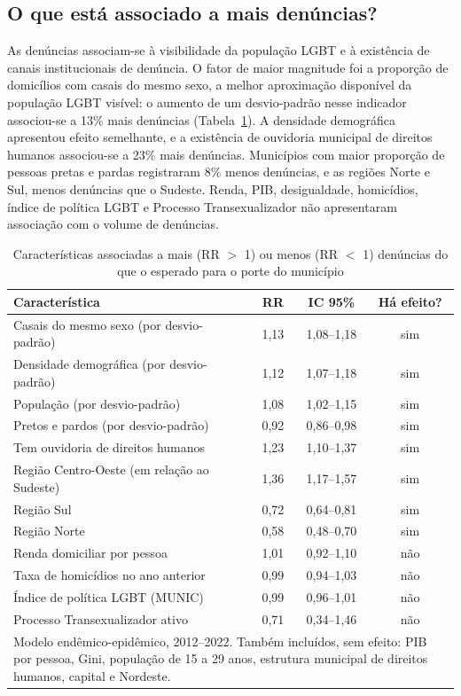 \documentclass[12pt]{article}
\begin{document}
\subsection{O que está associado a mais denúncias?}

As denúncias associam-se à visibilidade da população LGBT e à existência de canais institucionais de denúncia. O fator de maior magnitude foi a proporção de domicílios com casais do mesmo sexo, a melhor aproximação disponível da população LGBT visível: o aumento de um desvio-padrão nesse indicador associou-se a 13\% mais denúncias (Tabela~\ref{tab:coef}). A densidade demográfica apresentou efeito semelhante, e a existência de ouvidoria municipal de direitos humanos associou-se a 23\% mais denúncias. Municípios com maior proporção de pessoas pretas e pardas registraram 8\% menos denúncias, e as regiões Norte e Sul, menos denúncias que o Sudeste. Renda, PIB, desigualdade, homicídios, índice de política LGBT e Processo Transexualizador não apresentaram associação com o volume de denúncias.

\begin{table}[!htb]
\centering
\caption{Características associadas a mais (RR $>$ 1) ou menos (RR $<$ 1) denúncias do que o esperado para o porte do município}
\label{tab:coef}
{\renewcommand{\arraystretch}{1.1}\small
\begin{tabular}{p{6.8cm} c c c}
\toprule
\textbf{Característica} & \textbf{RR} & \textbf{IC 95\%} & \textbf{Há efeito?} \\
\midrule
Casais do mesmo sexo (por desvio-padrão) & 1,13 & 1,08--1,18 & sim \\
Densidade demográfica (por desvio-padrão) & 1,12 & 1,07--1,18 & sim \\
População (por desvio-padrão) & 1,08 & 1,02--1,15 & sim \\
Pretos e pardos (por desvio-padrão) & 0,92 & 0,86--0,98 & sim \\
Tem ouvidoria de direitos humanos & 1,23 & 1,10--1,37 & sim \\
Região Centro-Oeste (em relação ao Sudeste) & 1,36 & 1,17--1,57 & sim \\
Região Sul & 0,72 & 0,64--0,81 & sim \\
Região Norte & 0,58 & 0,48--0,70 & sim \\
Renda domiciliar por pessoa & 1,01 & 0,92--1,10 & não \\
Taxa de homicídios no ano anterior & 0,99 & 0,94--1,03 & não \\
Índice de política LGBT (MUNIC) & 0,99 & 0,96--1,01 & não \\
Processo Transexualizador ativo & 0,71 & 0,34--1,46 & não \\
\bottomrule
\multicolumn{4}{p{12cm}}{\footnotesize Modelo endêmico-epidêmico, 2012--2022. Também incluídos, sem efeito: PIB por pessoa, Gini, população de 15 a 29 anos, estrutura municipal de direitos humanos, capital e Nordeste.}
\end{tabular}}
\end{table}
\end{document}
